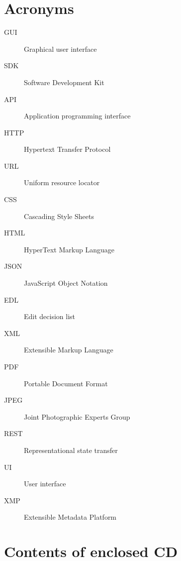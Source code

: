 \documentclass[thesis=B,english]{FITthesis}[2012/10/20]
\begin{document}
\chapter{Acronyms}
\begin{description}
	\item[GUI] Graphical user interface
	\item[SDK] Software Development Kit
	\item[API] Application programming interface
	\item[HTTP] Hypertext Transfer Protocol
	\item[URL] Uniform resource locator
	\item[CSS] Cascading Style Sheets
	\item[HTML] HyperText Markup Language
	\item[JSON] JavaScript Object Notation
	\item[EDL] Edit decision list
	\item[XML] Extensible Markup Language
	\item[PDF] Portable Document Format
	\item[JPEG] Joint Photographic Experts Group
	\item[REST] Representational state transfer
	\item[UI] User interface
	\item[XMP] Extensible Metadata Platform
\end{description}


\chapter{Contents of enclosed CD}


\begin{figure}
\end{figure}
\end{document}
